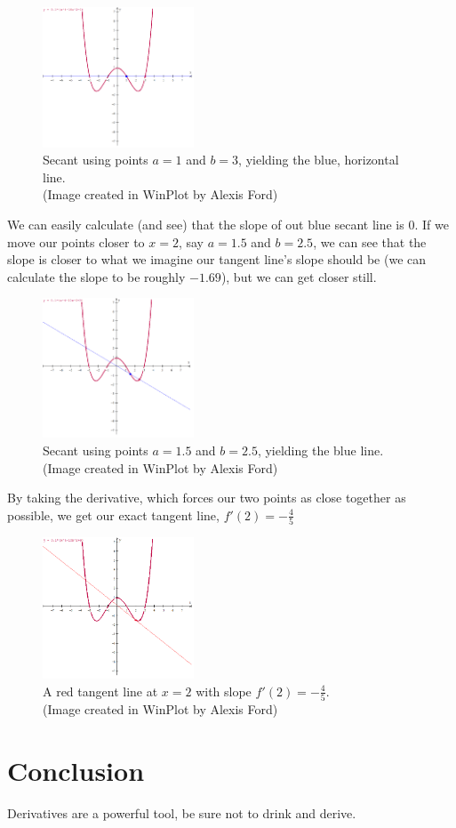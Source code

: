 \documentclass[aps,pra,notitlepage,amsmath,amssymb,letterpaper,12pt]{revtex4-1}
\begin{document}
\begin{figure}[h!] 
  \includegraphics[width=0.4\textwidth]{horizSec}
  \caption{Secant using points $a=1$ and $b=3$, yielding the blue, horizontal line.\\ (Image created in WinPlot by Alexis Ford)}
  \label{fig:fig1}
\end{figure}

We can easily calculate (and see) that the slope of out blue secant line is $0$. If we move our points closer to $x=2$, say $a=1.5$ and $b=2.5$, we can see that the slope is closer to what we imagine our tangent line's slope should be (we can calculate the slope to be roughly $-1.69$), but we can get closer still.

\begin{figure}[h!] 
  \includegraphics[width=0.4\textwidth]{closerSec} 
  \caption{Secant using points $a=1.5$ and $b=2.5$, yielding the blue line.\\ (Image created in WinPlot by Alexis Ford)}
  \label{fig:fig2}
\end{figure}

By taking the derivative, which forces our two points as close together as possible, we get our exact tangent line, $f'(2)=-\frac{4}{5}$

\begin{figure}[h!] 
  \includegraphics[width=0.4\textwidth]{tangent} 
  \caption{A red tangent line at $x=2$ with slope $f'(2)=-\frac{4}{5}$.\\ (Image created in WinPlot by Alexis Ford)}
  \label{fig:fig3}
\end{figure}
 
\section{Conclusion}
Derivatives are a powerful tool, be sure not to drink and derive.
\end{document}
